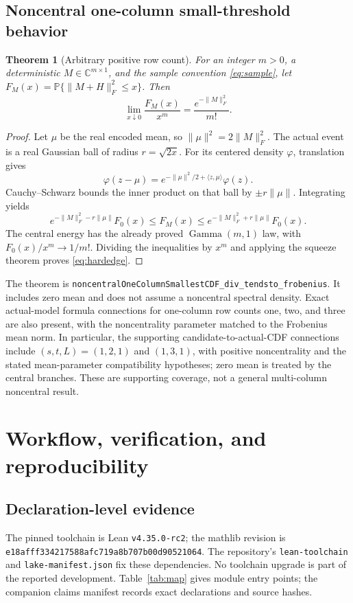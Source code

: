 \documentclass[11pt]{article}
\newtheorem{theorem}{Theorem}[section]
\newcommand{\C}{\mathbb C}
\newcommand{\Prob}{\mathbb P}
\newcommand{\lean}[1]{{\small\nolinkurl{#1}}}
\begin{document}
\subsection{Noncentral one-column small-threshold behavior}
\begin{theorem}[Arbitrary positive row count]\label{thm:onecolumn}
For an integer $m>0$, a deterministic $M\in\C^{m\times1}$, and the sample
convention \eqref{eq:sample}, let
$F_M(x)=\Prob\{\|M+H\|_F^2\leq x\}$. Then
\begin{equation}\label{eq:hardedge}
 \lim_{x\downarrow0}\frac{F_M(x)}{x^m}
       =\frac{e^{-\|M\|_F^2}}{m!}.
\end{equation}
\end{theorem}
\begin{proof}
Let $\mu$ be the real encoded mean, so $\|\mu\|^2=2\|M\|_F^2$.
The actual event is a real Gaussian ball of radius $r=\sqrt{2x}$.
For its centered density $\varphi$, translation gives
\[
 \varphi(z-\mu)=e^{-\|\mu\|^2/2+\langle z,\mu\rangle}\varphi(z).
\]
Cauchy--Schwarz bounds the inner product on that ball by
$\pm r\|\mu\|$. Integrating yields
\[
 e^{-\|M\|_F^2-r\|\mu\|}F_0(x)
 \leq F_M(x)\leq
 e^{-\|M\|_F^2+r\|\mu\|}F_0(x).
\]
The central energy has the already proved $\operatorname{Gamma}(m,1)$ law,
with $F_0(x)/x^m\to1/m!$. Dividing the inequalities by $x^m$ and applying
the squeeze theorem proves \eqref{eq:hardedge}.
\end{proof}
The theorem is
\lean{noncentralOneColumnSmallestCDF_div_tendsto_frobenius}.
It includes zero mean and does not assume a noncentral spectral density.
Exact actual-model formula connections for one-column row counts one, two,
and three are also present, with the noncentrality parameter matched to the
Frobenius mean norm. In particular, the supporting candidate-to-actual-CDF
connections include $(s,t,L)=(1,2,1)$ and $(1,3,1)$, with positive
noncentrality and the stated mean-parameter compatibility hypotheses; zero
mean is treated by the central branches. These are supporting coverage,
not a general multi-column noncentral result.

\section{Workflow, verification, and reproducibility}\label{sec:verification}
\subsection{Declaration-level evidence}
The pinned toolchain is Lean \lean{v4.35.0-rc2}; the mathlib revision is
\lean{e18afff334217588afc719a8b707b00d90521064}.
The repository's \lean{lean-toolchain} and \lean{lake-manifest.json} fix these
dependencies. No toolchain upgrade is part of the reported development.
Table~\ref{tab:map} gives module entry points; the companion claims manifest
records exact declarations and source hashes.
\end{document}
